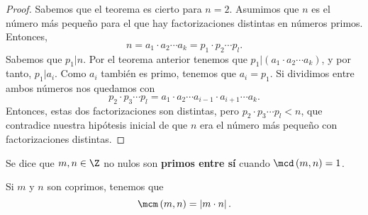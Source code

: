 \begin{proof}
Sabemos que el teorema es cierto para $\displaystyle n=2 $. Asumimos que $\displaystyle n $ es el número más pequeño para el que hay factorizaciones distintas en números primos. Entonces, 
\[n = a_{1} \cdot a_{2} \cdots a_{k} = p_{1} \cdot p_{2} \cdots p_{l} .\]
Sabemos que $\displaystyle p_{1}|n $. Por el teorema anterior tenemos que $\displaystyle p_{1}|\left(a_{1} \cdot a_{2} \cdots a_{k}\right) $, y por tanto, $\displaystyle p_{1} | a_{i} $. Como $\displaystyle a_{i} $ también es primo, tenemos que $\displaystyle a_{i} = p_{1} $. Si dividimos entre ambos números nos quedamos con
\[p_{2} \cdot p_{3} \cdots p_{l} = a_{1} \cdot a_{2} \cdots a_{i-1} \cdot a_{i+1} \cdots a_{k} .\]
Entonces, estas dos factorizaciones son distintas, pero $\displaystyle p_{2} \cdot p_{3} \cdots p_{l} <n $, que contradice nuestra hipótesis inicial de que $\displaystyle n $ era el número más pequeño con factorizaciones distintas.
\end{proof}

\begin{fdefinition}[]
\normalfont Se dice que $\displaystyle m,n \in \Z $ no nulos son \textbf{primos entre sí} cuando $\displaystyle \mcd\left(m,n\right)=1 $.
\end{fdefinition}

\begin{fcolorary}[]
\normalfont \normalfont Si $\displaystyle m $ y $\displaystyle n $ son coprimos, tenemos que 
\[\mcm\left(m,n\right) = \left|m \cdot n\right| .\]
\end{fcolorary}

